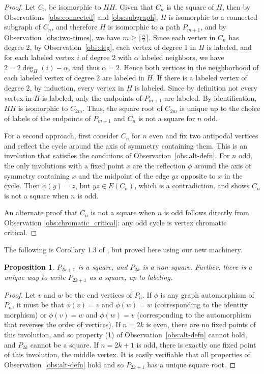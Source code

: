\documentclass{article}
\newtheorem{proposition}[theorem]{Proposition}
\theoremstyle{definition}
\begin{document}
\begin{proof}
Let $C_n$ be isomorphic to $HH$. Given that $C_{n}$ is the square of $H$, then by Observations~\ref{obs:connected} and \ref{obs:subgraph}, $H$ is isomorphic to a connected subgraph of $C_n$, and therefore $H$ is isomorphic to a path $P_{m+1}$, and by Observation~\ref{obs:two-times}, we have $m\geq \lceil\frac{n}{2}\rceil$. Since each vertex in $C_n$ has degree 2, by Observation~\ref{obs:deg}, each vertex of degree 1 in $H$ is labeled, and for each labeled vertex $i$ of degree 2 with $\alpha$ labeled neighbors, we have $2=2\deg_H(i)-\alpha$, and thus $\alpha=2$. Hence both vertices in the neighborhood of each labeled vertex of degree 2 are labeled in $H$. If there is a labeled vertex of degree 2, by induction, every vertex in $H$ is labeled. Since by definition not every vertex in $H$ is labeled, only the endpoints of $P_{m+1}$ are labeled. By identification, $HH$ is isomorphic to $C_{2m}$. Thus, the square root of $C_{2m}$ is unique up to the choice of labels of the endpoints of $P_{m+1}$ and $C_n$ is not a square for $n$ odd.  

For a second approach, first consider $C_n$ for $n$ even and fix two antipodal vertices and reflect the cycle around the axis of symmetry containing them. This is an involution that satisfies the conditions of Observation~\ref{obs:alt-defn}. For $n$ odd, the only involutions with a fixed point $x$ are the reflection $\phi$  around the axis of symmetry containing $x$ and the midpoint of the edge $yz$ opposite to $x$ in the cycle. Then $\phi(y)=z$, but $yz\in E(C_n)$, which is a contradiction, and shows $C_n$ is not a square when $n$ is odd.

An alternate proof that $C_n$ is not a square when $n$ is odd follows directly from Observation \ref{obs:chromatic_critical}: any odd cycle is vertex chromatic critical.

\end{proof}
The following is Corollary 1.3 of \cite{BRST20}, but proved here using our new machinery.
\begin{proposition}\cite{BRST20} \label{prop:paths}
    $P_{2k+1}$ is a square, and $P_{2k}$ is a non-square. Further, there is a unique way to write $P_{2k+1}$ as a square, up to labeling.
\end{proposition}

\begin{proof}
    Let $v$ and $w$ be the end vertices of $P_n$. If $\phi$ is any graph automorphism of $P_n$, it must be that $\phi(v) = v$ and $\phi(w) = w$ (corresponding to the identity morphism) or $\phi(v) = w$ and $\phi(w) = v$ (corresponding to the automorphism that reverses the order of vertices). If $n=2k$ is even, there are no fixed points of this involution, and so property (1) of Observation~\ref{obs:alt-defn} cannot hold, and $P_{2k}$ cannot be a square. If $n=2k+1$ is odd, there is exactly one fixed point of this involution, the middle vertex. It is easily verifiable that all properties of Observation~\ref{obs:alt-defn} hold and so $P_{2k+1}$ has a unique square root.
\end{proof}
\end{document}
